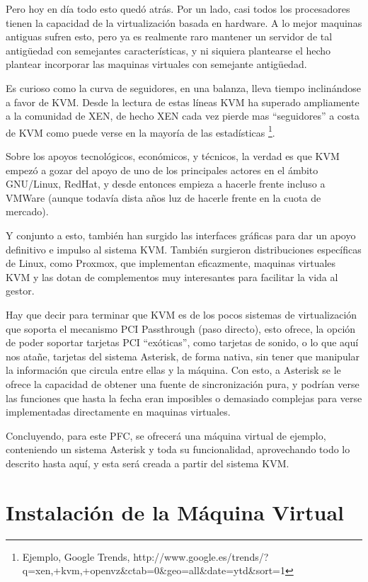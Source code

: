 Pero hoy en día todo esto quedó atrás. Por un lado, casi todos los procesadores tienen la capacidad de la virtualización basada en hardware. A lo mejor maquinas antiguas sufren esto, pero ya es realmente raro mantener un servidor de tal antigüedad con semejantes características, y ni siquiera plantearse el hecho plantear incorporar las maquinas virtuales con semejante antigüedad.

Es curioso como la curva de seguidores, en una balanza, lleva tiempo inclinándose a favor de KVM. Desde la lectura de estas líneas KVM ha superado ampliamente a la comunidad de XEN, de hecho XEN cada vez pierde mas ``seguidores'' a costa de KVM como puede verse en la mayoría de las estadísticas \footnote{Ejemplo, Google Trends, http://www.google.es/trends/?q=xen,+kvm,+openvz\&ctab=0\&geo=all\&date=ytd\&sort=1}.

Sobre los apoyos tecnológicos, económicos, y técnicos, la verdad es que KVM empezó a gozar del apoyo de uno de los principales actores en el ámbito GNU/Linux, RedHat, y desde entonces empieza a hacerle frente incluso a VMWare (aunque todavía dista años luz de hacerle frente en la cuota de mercado).

Y conjunto a esto, también han surgido las interfaces gráficas para dar un apoyo definitivo e impulso al sistema KVM. También surgieron distribuciones específicas de Linux, como Proxmox, que implementan eficazmente, maquinas virtuales KVM y las dotan de complementos muy interesantes para facilitar la vida al gestor.

Hay que decir para terminar que KVM es de los pocos sistemas de virtualización que soporta el mecanismo PCI Passthrough (paso directo), esto ofrece, la opción de poder soportar tarjetas PCI “exóticas”, como tarjetas de sonido, o lo que aquí nos atañe, tarjetas del sistema Asterisk, de forma nativa, sin tener que manipular la información que circula entre ellas y la máquina. Con esto, a Asterisk se le ofrece la capacidad de obtener una fuente de sincronización pura, y podrían verse las funciones que hasta la fecha eran imposibles o demasiado complejas para verse implementadas directamente en maquinas virtuales.

Concluyendo, para este PFC, se ofrecerá una máquina virtual de ejemplo, conteniendo un sistema Asterisk y toda su funcionalidad, aprovechando todo lo descrito hasta aquí, y esta será creada a partir del sistema KVM.

\section{Instalación de la Máquina Virtual}

